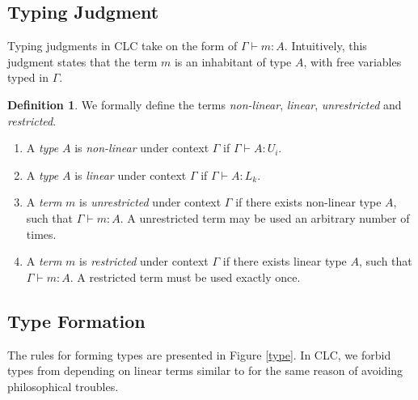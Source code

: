 \documentclass[sigplan,screen]{acmart}
\theoremstyle{definition}
\newtheorem{definition}{Definition}[section]
\begin{document}
  \subsection{Typing Judgment}
  Typing judgments in CLC take on the form of $\Gamma \vdash m : A$. Intuitively, this judgment states that the term $m$ is an inhabitant of type $A$, with free variables typed in $\Gamma$.

  \begin{definition} We formally define the terms \textit{non-linear}, \textit{linear}, \textit{unrestricted} and \textit{restricted}.
    \begin{enumerate}
      \item A \textit{type} $A$ is \textit{non-linear} under context $\Gamma$ if $\Gamma \vdash A : U_i$.
      \item A \textit{type} $A$ is \textit{linear} under context $\Gamma$ if $\Gamma \vdash A : L_k$.
      \item A \textit{term} $m$ is \textit{unrestricted} under context $\Gamma$ if there exists non-linear type $A$, such that $\Gamma \vdash m : A$. A unrestricted term may be used an arbitrary number of times.
      \item A \textit{term} $m$ is \textit{restricted} under context $\Gamma$ if there exists linear type $A$, such that $\Gamma \vdash m : A$. A restricted term must be used exactly once.
    \end{enumerate}
  \end{definition}

  \subsection{Type Formation} \label{tyformation}
  The rules for forming types are presented in Figure \ref{type}. In CLC, we forbid types from depending on linear terms similar to \cite{llf,neel15} for the same reason of avoiding philosophical troubles.
\end{document}
